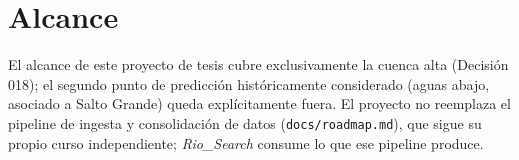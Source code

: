 \section{Alcance}

El alcance de este proyecto de tesis cubre exclusivamente la cuenca alta (Decisi\'on 018); el
segundo punto de predicci\'on hist\'oricamente considerado (aguas abajo, asociado a Salto Grande)
queda expl\'icitamente fuera. El proyecto no reemplaza el pipeline de ingesta y consolidaci\'on de
datos (\texttt{docs/roadmap.md}), que sigue su propio curso independiente; \emph{Rio\_Search}
consume lo que ese pipeline produce.
